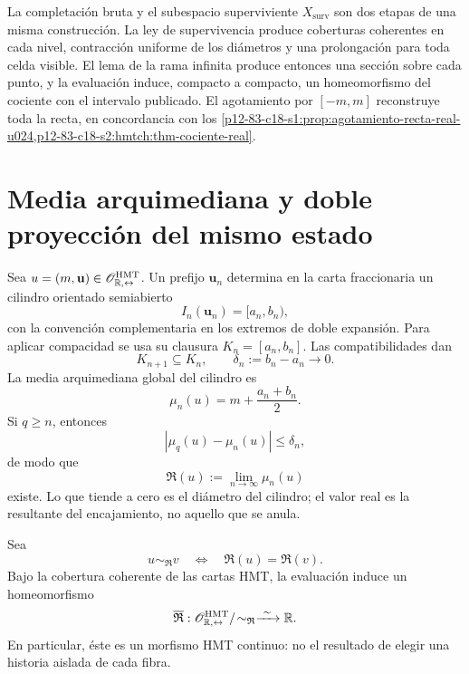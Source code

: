 \begin{remark}
\label{p12-83-c18-s2:hmtch:rem-version-superviviente}
La completación bruta y el subespacio superviviente
\(X_{\mathrm{surv}}\) son dos etapas de una misma construcción. La ley de
supervivencia produce coberturas coherentes en cada nivel, contracción
uniforme de los diámetros y una prolongación para toda celda visible. El lema
de la rama infinita produce entonces una sección sobre cada punto, y la
evaluación induce, compacto a compacto, un homeomorfismo del cociente con el
intervalo publicado. El agotamiento por \([-m,m]\) reconstruye toda la recta,
en concordancia con los
\cref{p12-83-c18-s1:prop:agotamiento-recta-real-u024,p12-83-c18-s2:hmtch:thm-cociente-real}.
\end{remark}

\section{Media arquimediana y doble proyección del mismo estado}

Sea \(u=(m,\mathbf u)\in
\mathscr O_{\mathbb R,\leftrightarrow}^{\rm HMT}\). Un prefijo
\(\mathbf u_n\) determina en la carta fraccionaria un cilindro orientado
semiabierto
\[
 I_n(\mathbf u_n)=[a_n,b_n),
\]
con la convención complementaria en los extremos de doble expansión. Para
aplicar compacidad se usa su clausura
\(K_n=[a_n,b_n]\). Las compatibilidades dan
\[
 K_{n+1}\subseteq K_n,
 \qquad
 \delta_n:=b_n-a_n\longrightarrow0.
\]
La media arquimediana global del cilindro es
\[
 \mu_n(u)=m+\frac{a_n+b_n}{2}.
\]
Si \(q\geq n\), entonces
\[
 |\mu_q(u)-\mu_n(u)|\leq\delta_n,
\]
de modo que
\begin{equation}
 \mathfrak R(u):=\lim_{n\to\infty}\mu_n(u)
 \label{p12-83-c18-s2:hmtch:eq-media-arquimediana}
\end{equation}
existe. Lo que tiende a cero es el diámetro del cilindro; el valor real es
la resultante del encajamiento, no aquello que se anula.

\begin{theorem}
\label{p12-83-c18-s2:hmtch:thm-cociente-two-way-real}
Sea
\[
 u\sim_{\mathfrak R}v
 \quad\Longleftrightarrow\quad
 \mathfrak R(u)=\mathfrak R(v).
\]
Bajo la cobertura coherente de las cartas HMT, la evaluación induce un
homeomorfismo
\begin{equation}
 \overline{\mathfrak R}:
 \mathscr O_{\mathbb R,\leftrightarrow}^{\rm HMT}/\!
 \sim_{\mathfrak R}
 \xrightarrow{\ \sim\ }\mathbb R.
 \label{p12-83-c18-s2:hmtch:eq-homeomorfismo-two-way-real}
\end{equation}
En particular, éste es un morfismo HMT continuo: no el resultado de elegir
una historia aislada de cada fibra.
\end{theorem}

